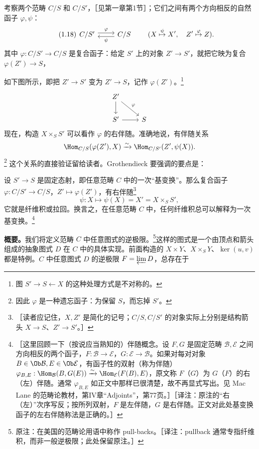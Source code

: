 考察两个范畴 $C/S$ 和 $C/S'$，［见第一章第1节］；它们之间有两个方向相反的自然函子 $\varphi,\psi$：
\begin{equation}\tag{1.18}
\begin{tikzcd}[ampersand replacement=\&]
 C/S'\arrow[r,shift left=.6ex,"\varphi"] \&C/S\arrow[l,shift left=.6ex,"\psi"]
\end{tikzcd}
\qquad(X\overset{\psi}{\mapsto}X',\quad Z'\overset{\varphi}{\mapsto}Z).
\end{equation}
其中 $\varphi:C/S'\to C/S$ 是复合函子：给定 $S'$ 上的对象 $Z'\to S'$，就把它映为复合 $\varphi(Z')\to S$，

如下图所示，即把 $Z'\to S'$ 变为 $Z'\to S$，记作 $\varphi(Z')$。\footnote{图 $S'\to S\leftarrow X$ 的这种处理方式是不对称的。}
\[
\begin{tikzcd}[ampersand replacement=\&]
 Z'\arrow[d]\arrow[dr,"\varphi"]\&\\S'\arrow[r]\&S
\end{tikzcd}
\]
现在，构造 $X\times_S S'$ 可以看作 $\varphi$ 的右伴随。准确地说，有伴随关系
\[
 \Hom_{C/S}(\varphi(Z'),X)\xrightarrow\sim
 \Hom_{C/S'}(Z',\psi(X)).
\]
\footnote{因此 $\varphi$ 是一种遗忘函子：为保留 $S$，而忘掉 $S'$。}
这个关系的直接验证留给读者。Grothendieck 要强调的要点是：

设 $S'\to S$ 是固定态射，即任意范畴 $C$ 中的一次“基变换”。那么复合函子 $\varphi:C/S'\to C/S$，$Z'\mapsto\varphi(Z')$，有右伴随\footnote{［读者应记住，$X,Z'$ 是简化的记号；$C/S,C/S'$ 的对象实际上分别是结构箭头 $X\to S$、$Z'\to S'$。］}
\[
 \psi:X\longmapsto\psi(X)=X'=X\times_S S',
\]
它就是纤维积或拉回。换言之，在任意范畴 $C$ 中，任何纤维积总可以解释为一次基变换。\footnote{［这里回顾一下（按说应当熟知的）伴随概念。设 $F,G$ 是固定范畴 $\mathcal B,\mathcal E$ 之间方向相反的两个函子，$F:\mathcal B\to\mathcal E$，$G:\mathcal E\to\mathcal B$。如果对每对对象 $B\in\Ob\mathcal B,E\in\Ob\mathcal E$，有函子性的双射（称为伴随）$\varphi_{B,E}:\Hom_{\mathcal B}(B,G(E))\xrightarrow\sim\Hom_{\mathcal E}(F(B),E)$，原文称 $F$（$G$）为 $G$（$F$）的右（左）伴随。通常 $\varphi_{B,E}$ 如正文中那样已很清楚，故不再显式写出。见 Mac Lane 的范畴论教材，第IV章“Adjoints”，第77页。］［译注：原注的“右（左）”次序写反；按所列双射，$F$ 是左伴随，$G$ 是右伴随。正文对此处基变换函子的左右伴随称法是正确的。］}

\textbf{概要。}我们将定义范畴 $C$ 中任意图式的逆极限。\footnote{原注：在美国的范畴论用语中称作 pull-backs。［译注：pullback 通常专指纤维积，而非一般逆极限；此处保留原注。］}这样的图式是一个由顶点和箭头组成的抽象图式 $D$ 在 $C$ 中的具体实现。前面构造的 $X\times Y$、$X\times_S Y$、$\ker(u,v)$ 都是特例。$C$ 中任意图式 $D$ 的逆极限 $F=\varprojlim D$，总存在于

